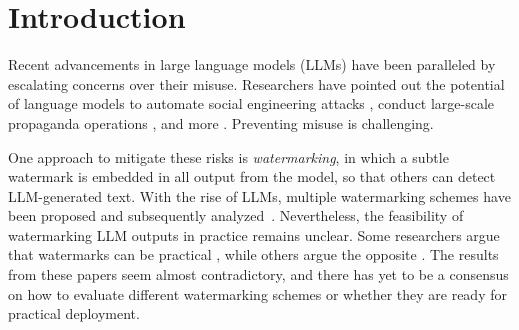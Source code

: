 \section{Introduction}

Recent advancements in large language models (LLMs) have been paralleled by escalating concerns over their misuse.
%
Researchers have pointed out the potential of language models to automate social engineering attacks \citep{GovTech}, conduct large-scale propaganda operations \citep{goldstein2023generative}, and more \citep{gpt4system}.
%
Preventing misuse is challenging.
%
%
%

One approach to mitigate these risks is \emph{watermarking}, in which a subtle watermark is embedded in all output from the model, so that others can detect LLM-generated text.
%
%
%
%
With the rise of LLMs, multiple watermarking schemes have been proposed \citep{aaronson_watermarking_2022,kirchenbauer_watermark_2023,christ_undetectable_2023} and subsequently analyzed~\citep{chakraborty_possibilities_2023,sadasivan_can_2023,jiang_evading_2023,krishna_paraphrasing_2023}.
%
Nevertheless, the feasibility of watermarking LLM outputs in practice remains unclear. Some researchers argue that watermarks can be practical \citep{krishna_paraphrasing_2023}, while others argue the opposite \citep{sadasivan_can_2023,jiang_evading_2023}.
%
The results from these papers seem almost contradictory, and there has yet to be a consensus on how to evaluate different watermarking schemes or whether they are ready for practical deployment.

